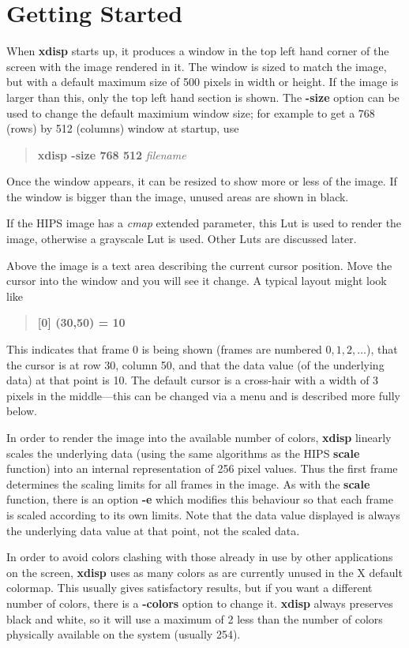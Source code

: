 \section{Getting Started}
When {\bf xdisp} starts up, it produces a window in the top left hand corner of the screen with the image rendered in it. The window is sized to match the image, but with a default maximum size of 500 pixels in width or height. If the image is larger than this, only the top left hand section is shown. The {\bf -size} option can be used to change the default maximium window size; for example to get a 768 (rows) by 512 (columns) window at startup, use
\begin{quote}
{\bf xdisp -size 768 512} {\it filename}
\end{quote}
Once the window appears, it can be resized to show more or less of the image. If the window is bigger than the image, unused areas are shown in black. 

If the HIPS image has a {\it cmap\/} extended parameter, this Lut is used to render the image, otherwise a grayscale Lut is used. Other Luts are discussed later.

Above the image is a text area describing the current cursor position. Move the cursor into the window and you will see it change.
A typical layout might look like 
\begin{quote}
{\bf [0] (30,50) = 10}
\end{quote}
This indicates that frame 0 is being shown (frames are numbered $0,1,2,\ldots$), that the cursor is at row 30, column 50, and that the data value (of the underlying data) at that point is 10. The default cursor is a cross-hair with a width of 3 pixels in the middle---this can be changed via a menu and is described more fully below.

In order to render the image into the available number of colors, {\bf xdisp} linearly scales the underlying data (using the same algorithms as the HIPS {\bf scale} function) into an internal representation of 256 pixel values. Thus the first frame determines the scaling limits for all frames in the image. As with the {\bf scale} function, there is an option {\bf -e} which modifies this behaviour so that each frame is scaled according to its own limits. Note that the data value displayed is always the underlying data value at that point, not the scaled data.

In order to avoid colors clashing with those already in use by other applications on the screen, {\bf xdisp} uses as many colors as are currently unused in the X default colormap. This usually gives satisfactory results, but if you want a different number of colors, there is a {\bf -colors} option to change it. {\bf xdisp} always preserves black and white, so it will use a maximum of 2 less than the number of colors physically available on the system (usually 254).

